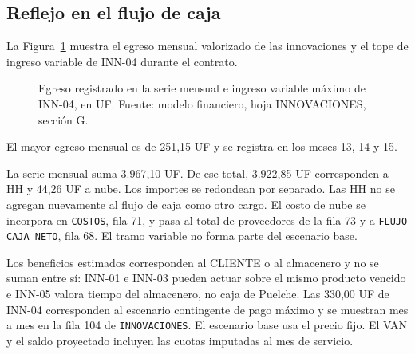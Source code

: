 \subsection{Reflejo en el flujo de caja}
\label{sec:e2-inn-flujo}

La Figura~\ref{fig:e2-inn-mensual} muestra el egreso mensual valorizado de las innovaciones y el tope de ingreso variable de INN-04 durante el contrato.

\begin{figure}[htbp]\centering
{}
\caption{Egreso registrado en la serie mensual e ingreso variable máximo de INN-04, en UF. Fuente: modelo financiero, hoja INNOVACIONES, sección G.}
\label{fig:e2-inn-mensual}
\end{figure}

El mayor egreso mensual es de 251,15 UF y se registra en los meses 13, 14 y 15.

La serie mensual suma 3.967,10 UF. De ese total, 3.922,85 UF corresponden a HH y 44,26 UF a nube. Los importes se redondean por separado. Las HH no se agregan nuevamente al flujo de caja como otro cargo. El costo de nube se incorpora en \texttt{COSTOS}, fila 71, y pasa al total de proveedores de la fila 73 y a \texttt{FLUJO CAJA NETO}, fila 68. El tramo variable no forma parte del escenario base.

Los beneficios estimados corresponden al CLIENTE o al almacenero y no se suman entre sí: INN-01 e INN-03 pueden actuar sobre el mismo producto vencido e INN-05 valora tiempo del almacenero, no caja de Puelche. Las 330,00 UF de INN-04 corresponden al escenario contingente de pago máximo y se muestran mes a mes en la fila 104 de \texttt{INNOVACIONES}. El escenario base usa el precio fijo. El VAN y el saldo proyectado incluyen las cuotas imputadas al mes de servicio.

